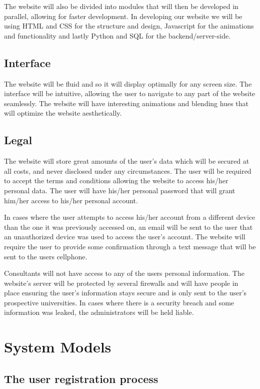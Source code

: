 \documentclass[a4paper, 12pt]{article}
\begin{document}
The website will also be divided into modules that will then be developed in parallel, allowing for faster development. In developing our website we will be using HTML and CSS for the structure and design, Javascript for the animations and functionality and lastly Python and SQL for the backend/server-side.

\subsection{Interface}

The website will be fluid and so it will display optimally for any screen size. The interface will be intuitive, allowing the user to navigate to any part of the website seamlessly. The website will have interesting animations and blending hues that will optimize the website aesthetically.

\subsection{Legal}

The website will store great amounts of the user's data which will be secured at all costs, and never disclosed under any circumstances. The user will be required to accept the terms and conditions allowing the website to access his/her personal data. The user will have his/her personal password that will grant him/her access to his/her personal account.

In cases where the user attempts to access his/her account from a different device than the one it was previously accessed on, an email will be sent to the user that an unauthorized device  was used to access the user's account. The website will require the user to provide some confirmation through a text message that will be sent to the users cellphone.

Consultants will not have access to any of the users personal information. The website's server will be protected by several firewalls and will have people in place ensuring the user's information stays secure and is only sent to the user's prospective universities. In cases where there is a security breach and some information was leaked, the administrators will be held liable.

\newpage
\section{System Models}

\subsection{The user registration process}
\end{document}
